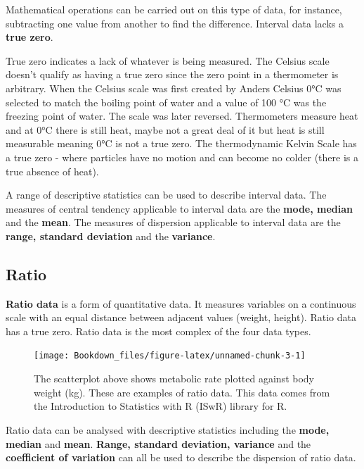 \documentclass[
]{book}
\begin{document}
Mathematical operations can be carried out on this type of data, for instance, subtracting one value from another to find the difference. Interval data lacks a \textbf{true zero}.

True zero indicates a lack of whatever is being measured. The Celsius scale doesn't qualify as having a true zero since the zero point in a thermometer is arbitrary. When the Celsius scale was first created by Anders Celsius 0°C was selected to match the boiling point of water and a value of 100 °C was the freezing point of water. The scale was later reversed. Thermometers measure heat and at 0°C there is still heat, maybe not a great deal of it but heat is still measurable meaning 0°C is not a true zero. The thermodynamic Kelvin Scale has a true zero - where particles have no motion and can become no colder (there is a true absence of heat).

A range of descriptive statistics can be used to describe interval data. The measures of central tendency applicable to interval data are the \textbf{mode, median} and the \textbf{mean}. The measures of dispersion applicable to interval data are the \textbf{range, standard deviation} and the \textbf{variance}.

\hypertarget{ratio}{%
\subsection{Ratio}\label{ratio}}

\textbf{Ratio data} is a form of quantitative data. It measures variables on a continuous scale with an equal distance between adjacent values (weight, height). Ratio data has a true zero. Ratio data is the most complex of the four data types.

\begin{figure}

{\centering \texttt{[image: Bookdown\_files/figure-latex/unnamed-chunk-3-1]} 

}

\caption{The scatterplot above shows metabolic rate plotted against body weight (kg). These are examples of ratio data. This data comes from the Introduction to Statistics with R (ISwR) library for R.}\label{fig:unnamed-chunk-3}
\end{figure}

Ratio data can be analysed with descriptive statistics including the \textbf{mode, median} and \textbf{mean}. \textbf{Range, standard deviation, variance} and the \textbf{coefficient of variation} can all be used to describe the dispersion of ratio data.
\end{document}
